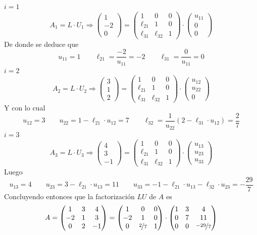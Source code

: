 \begin{sol}
\noindent\underline{$i=1$}
$$A_1=L\cdot U_1\Longrightarrow\begin{pmatrix}
1\\-2\\0    
\end{pmatrix}=\begin{pmatrix}
  1&0&0\\
\ell_{21}&1&0\\
\ell_{31}&\ell_{32}&1 
\end{pmatrix}\cdot \begin{pmatrix}
u_{11}\\0\\0
\end{pmatrix}$$
De donde se deduce que
$$u_{11}=1\qquad \ell_{21}=\dfrac{-2}{u_{11}}=-2\qquad\ell_{31}=\dfrac{0}{u_{11}}=0$$
\underline{$i=2$}
$$A_2=L\cdot U_2\Longrightarrow\begin{pmatrix}
3\\1\\2    
\end{pmatrix}=\begin{pmatrix}
  1&0&0\\
\ell_{21}&1&0\\
\ell_{31}&\ell_{32}&1 
\end{pmatrix}\cdot \begin{pmatrix}
u_{12}\\u_{22}\\0
\end{pmatrix}$$
Y con lo cual
$$u_{12}=3\qquad u_{22}=1-\ell_{21}\cdot u_{12}=7\qquad \ell_{32}=\dfrac{1}{u_{22}}(2-\ell_{31}\cdot u_{12})=\dfrac{2}{7}$$
\underline{$i=3$}
$$A_3=L\cdot U_3\Longrightarrow\begin{pmatrix}
4\\3\\-1    
\end{pmatrix}=\begin{pmatrix}
  1&0&0\\
\ell_{21}&1&0\\
\ell_{31}&\ell_{32}&1 
\end{pmatrix}\cdot \begin{pmatrix}
u_{13}\\u_{23}\\u_{33}
\end{pmatrix}$$
Luego
$$u_{13}=4\qquad u_{23}=3-\ell_{21}\cdot u_{13}=11\qquad u_{33}=-1-\ell_{21}\cdot u_{13}-\ell_{32}\cdot u_{23}=-\dfrac{29}{7}$$
Concluyendo entonces que la factorización $LU$ de $A$ es
$$A=\begin{pmatrix}
1&3&4\\
-2&1&3\\
0&2&-1\\
\end{pmatrix}=\begin{pmatrix}
1&0&0\\
-2&1&0\\
0&\nicefrac{2}{7}&1
\end{pmatrix}\cdot\begin{pmatrix}
1&3&4\\
0&7&11\\
0&0&\nicefrac{-29}{7}
\end{pmatrix}$$
\end{sol}
